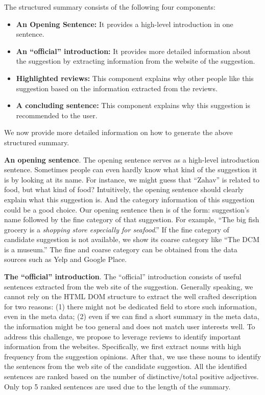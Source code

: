 The structured summary consists of the following four components: 
\begin{itemize}
\item \textbf{An Opening Sentence:} It provides a high-level 
introduction in one sentence. 
\item \textbf{An ``official'' introduction:} It provides 
more detailed information about the suggestion by extracting 
information from the website of the suggestion. 
\item \textbf{Highlighted reviews:} This component explains
why other people like this suggestion based on the information 
extracted from the reviews. 
\item \textbf{A concluding sentence:} This component explains
why this suggestion is recommended to the user.  
\end{itemize} 

We now provide more detailed information on how to generate
the above structured summary. 

\textbf{An opening sentence}.
  The opening sentence serves as a high-level introduction 
  sentence. Sometimes people can even hardly know what kind 
  of the suggestion it is by looking at its name. For instance,
  we might guess that ``Zahav'' is related to
  food, but what kind of food? Intuitively, the opening 
  sentence should clearly explain what this suggestion is. 
  And the category information of this suggestion could be a good choice.  
  Our opening sentence then is of the form:
  suggestion's name followed by the fine category of that 
  suggestion. For example, ``The big fish grocery is a
  \textit{shopping store especially for seafood}.'' If the 
  fine category of candidate suggestion is not available, 
  we show its coarse category like ``The DCM is a museum.'' 
  The fine and coarse category can be obtained from the data 
  sources such as Yelp and Google Place. 

\textbf{The ``official'' introduction}.
  The ``official'' introduction consists of useful
  sentences extracted from the web site of the suggestion. 
  Generally speaking, we cannot rely on the HTML DOM structure
  to extract the well crafted description for two reasons: 
  (1) there might not be dedicated field to store such information, 
  even in the meta data; 
  (2) even if we can find a short summary in the meta data, 
  the information might be too general and does not match user 
interests well. 
  To address this challenge, we propose to leverage reviews
  to identify important information from the websites. 
  Specifically, we first extract nouns with high frequency 
  from the suggestion opinions.  After that, we use these
  nouns to identify the sentences from the web site 
  of the candidate suggestion. 
  All the identified sentences are ranked based on the 
  number of distinctive/total positive adjectives.   
  Only top 5 ranked sentences are used due to the length of the summary. 

